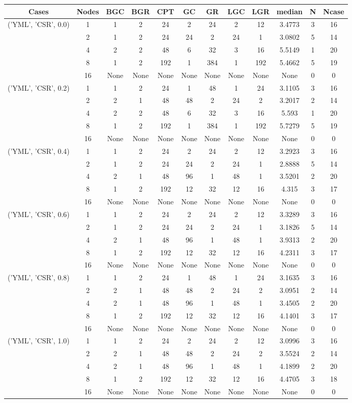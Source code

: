 \begin{tabular}{cccccccccccc}
\hline
Cases & Nodes& BGC& BGR& CPT& GC& GR& LGC& LGR& median & N & Ncase \\
\hline
\multirow{5}{*}{('YML', 'CSR', 0.0)}& 1& 1& 2& 24& 2& 24& 2& 12& 3.4773& 3& 16\\
& 2& 1& 2& 24& 24& 2& 24& 1& 3.0802& 5& 14\\
& 4& 2& 2& 48& 6& 32& 3& 16& 5.5149& 1& 20\\
& 8& 1& 2& 192& 1& 384& 1& 192& 5.4662& 5& 19\\
& 16& None& None& None& None& None& None& None& None& 0& 0\\
\hline
\multirow{5}{*}{('YML', 'CSR', 0.2)}& 1& 1& 2& 24& 1& 48& 1& 24& 3.1105& 3& 16\\
& 2& 2& 1& 48& 48& 2& 24& 2& 3.2017& 2& 14\\
& 4& 2& 2& 48& 6& 32& 3& 16& 5.593& 1& 20\\
& 8& 1& 2& 192& 1& 384& 1& 192& 5.7279& 5& 19\\
& 16& None& None& None& None& None& None& None& None& 0& 0\\
\hline
\multirow{5}{*}{('YML', 'CSR', 0.4)}& 1& 1& 2& 24& 2& 24& 2& 12& 3.2923& 3& 16\\
& 2& 1& 2& 24& 24& 2& 24& 1& 2.8888& 5& 14\\
& 4& 2& 1& 48& 96& 1& 48& 1& 3.5201& 2& 20\\
& 8& 1& 2& 192& 12& 32& 12& 16& 4.315& 3& 17\\
& 16& None& None& None& None& None& None& None& None& 0& 0\\
\hline
\multirow{5}{*}{('YML', 'CSR', 0.6)}& 1& 1& 2& 24& 2& 24& 2& 12& 3.3289& 3& 16\\
& 2& 1& 2& 24& 24& 2& 24& 1& 3.1826& 5& 14\\
& 4& 2& 1& 48& 96& 1& 48& 1& 3.9313& 2& 20\\
& 8& 1& 2& 192& 12& 32& 12& 16& 4.2311& 3& 17\\
& 16& None& None& None& None& None& None& None& None& 0& 0\\
\hline
\multirow{5}{*}{('YML', 'CSR', 0.8)}& 1& 1& 2& 24& 1& 48& 1& 24& 3.1635& 3& 16\\
& 2& 2& 1& 48& 48& 2& 24& 2& 3.0951& 2& 14\\
& 4& 2& 1& 48& 96& 1& 48& 1& 3.4505& 2& 20\\
& 8& 1& 2& 192& 12& 32& 12& 16& 4.1401& 3& 17\\
& 16& None& None& None& None& None& None& None& None& 0& 0\\
\hline
\multirow{5}{*}{('YML', 'CSR', 1.0)}& 1& 1& 2& 24& 2& 24& 2& 12& 3.0996& 3& 16\\
& 2& 2& 1& 48& 48& 2& 24& 2& 3.5524& 2& 14\\
& 4& 2& 1& 48& 96& 1& 48& 1& 4.1899& 2& 20\\
& 8& 1& 2& 192& 12& 32& 12& 16& 4.4705& 3& 18\\
& 16& None& None& None& None& None& None& None& None& 0& 0\\
\hline
\end{tabular}



